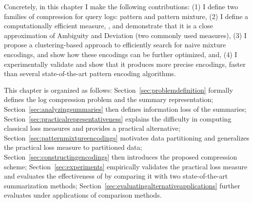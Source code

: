 Concretely, in this chapter I make the following contributions:
(1) I define two families of compression for query logs: pattern and pattern mixture, 
(2) I define a computationally efficient measure, \errorname, and demonstrate that it is a close approximation of Ambiguity and Deviation (two commonly used measures),
(3) I propose a clustering-based approach to efficiently search for naive mixture encodings, and show how these encodings can be further optimized, and, 
(4) I experimentally validate \systemnameone and show that it produces more precise encodings, faster than several state-of-the-art pattern encoding algorithms.

This chapter is organized as follows: Section~\ref{sec:problemdefinition} formally defines the log compression problem and the summary representation;
Section~\ref{sec:analyzingsummaries} then defines information loss of the summaries;
Section~\ref{sec:practicalrepresentativeness} explains the difficulty in computing classical loss measures and provides a practical alternative;
Section~\ref{sec:patternmixtureencodings} motivates data partitioning and generalizes the practical loss measure to partitioned data;
Section~\ref{sec:constructingencodings} then introduces the proposed \systemnameone compression scheme;
Section~\ref{sec:experiments} empirically validates the practical loss measure and evaluates the effectiveness of \systemnameone by comparing it with two state-of-the-art summarization methods;
Section~\ref{sec:evaluatingalternativeapplications} further evaluates \systemnameone under applications of comparison methods.